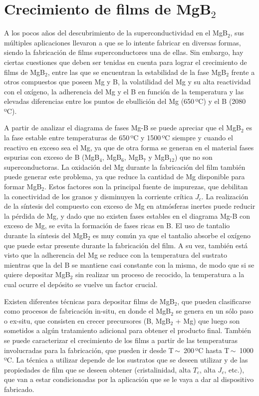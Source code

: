 \section{Crecimiento de films de MgB$_2$}\label{S:crecimiento}
A los pocos años del descubrimiento de la superconductividad en el MgB$_2$, sus múltiples aplicaciones llevaron a que se lo intente fabricar en diversas formas\cite{Vinod2010, Xi2004}, siendo la fabricación de films superconductores una de ellas\cite{Vaglio2002, Zhai1995, Saito2002, Park2009}. Sin embargo, hay ciertas cuestiones que deben ser tenidas en cuenta para lograr el crecimiento de films de MgB$_2$, entre las que se encuentran la estabilidad de la fase MgB$_2$ frente a otros compuestos que poseen Mg y B, la volatilidad del Mg y su alta reactividad con el oxígeno, la adherencia del Mg y el B en función de la temperatura y las elevadas diferencias entre los puntos de ebullición del Mg (650\,ºC) y el B (2080\,ºC).

A partir de analizar el diagrama de fases Mg-B se puede apreciar que el MgB$_2$ es la fase estable entre temperaturas de 650\,ºC y 1500\,ºC siempre y cuando el reactivo en exceso sea el Mg\cite{moffatt1981handbook}, ya que de otra forma se generan en el material fases espurias con exceso de B (MgB$_4$, MgB$_6$, MgB$_7$ y MgB$_{12}$) que no son superconductoras\cite{Vinod2010}. La oxidación del Mg durante la fabricación del film también puede generar este problema, ya que reduce la cantidad de Mg disponible para formar MgB$_2$. Estos factores son la principal fuente de impurezas, que debilitan la conectividad de los granos y disminuyen la corriente crítica $J_c$. La realización de la síntesis del compuesto con exceso de Mg en atmósferas inertes puede reducir la pérdida de Mg, y dado que no existen fases estables en el diagrama Mg-B con exceso de Mg, se evita la formación de fases ricas en B. El uso de tantalio durante la síntesis del MgB$_2$ es muy común ya que el tantalio absorbe el oxígeno que puede estar presente durante la fabricación del film\cite{Barrabas2011, Naito2004, Zhai1995}. A su vez, también está visto que la adherencia del Mg se reduce con la temperatura del sustrato mientras que la del B se mantiene casi constante con la misma\cite{Kim2003}, de modo que si se quiere depositar MgB$_{2}$ sin realizar un proceso de recocido, la temperatura a la cual ocurre el depósito se vuelve un factor crucial.

Existen diferentes técnicas para depositar films de MgB$_2$, que pueden clasificarse como procesos de fabricación in-situ, en donde el MgB$_2$ se genera en un sólo paso o ex-situ, que consisten en crecer precursores (B, MgB$_2$ + Mg) que luego son sometidos a algún tratamiento adicional para obtener el producto final. También se puede ca\-rac\-te\-ri\-zar el crecimiento de los films a partir de las temperaturas involucradas para la fabricación, que pueden ir desde T\,$\sim$\, 200\,ºC hasta T\,$\sim$\, 1000\,ºC. La técnica a utilizar depende de los sustratos que se deseen utilizar y de las propiedades de film que se deseen obtener (cristalinidad, alta $T_c$, alta $J_c$, etc.), que van a estar condicionadas por la aplicación que se le vaya a dar al dispositivo fabricado.


